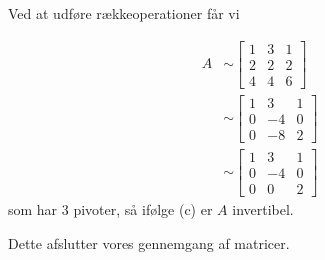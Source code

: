 \begin{solution}
Ved at udføre rækkeoperationer får vi

\[
\begin{aligned}
A & \sim\left[\begin{array}{lll}
1 & 3 & 1 \\
2 & 2 & 2 \\
4 & 4 & 6
\end{array}\right] \\
& \sim\left[\begin{array}{ccc}
1 & 3 & 1 \\
0 & -4 & 0 \\
0 & -8 & 2
\end{array}\right] \\
& \sim\left[\begin{array}{ccc}
1 & 3 & 1 \\
0 & -4 & 0 \\
0 & 0 & 2
\end{array}\right]
\end{aligned}
\]
som har 3 pivoter, så ifølge (c) er $A$ invertibel.
\end{solution}

Dette afslutter vores gennemgang af matricer.
